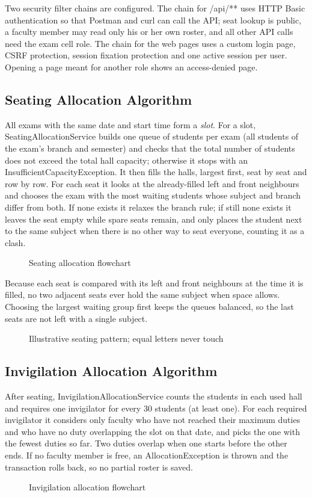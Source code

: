 \documentclass[12pt,letterpaper]{article}
\renewcommand{\texttt}[1]{#1}
\begin{document}
Two security filter chains are configured. The chain for \texttt{/api/**} uses HTTP Basic authentication so that Postman and curl can call the API; seat lookup is public, a faculty member may read only his or her own roster, and all other API calls need the exam cell role. The chain for the web pages uses a custom login page, CSRF protection, session fixation protection and one active session per user. Opening a page meant for another role shows an access-denied page.

\subsection{Seating Allocation Algorithm}
All exams with the same date and start time form a \emph{slot}. For a slot, \texttt{SeatingAllocationService} builds one queue of students per exam (all students of the exam's branch and semester) and checks that the total number of students does not exceed the total hall capacity; otherwise it stops with an \texttt{InsufficientCapacityException}. It then fills the halls, largest first, seat by seat and row by row. For each seat it looks at the already-filled left and front neighbours and chooses the exam with the most waiting students whose subject and branch differ from both. If none exists it relaxes the branch rule; if still none exists it leaves the seat empty while spare seats remain, and only places the student next to the same subject when there is no other way to seat everyone, counting it as a clash.
\begin{figure}[H]\centering
\resizebox{!}{0.55\textheight}{}
\caption{Seating allocation flowchart}
\end{figure}
Because each seat is compared with its left and front neighbours at the time it is filled, no two adjacent seats ever hold the same subject when space allows. Choosing the largest waiting group first keeps the queues balanced, so the last seats are not left with a single subject.
\begin{figure}[H]\centering

\caption{Illustrative seating pattern; equal letters never touch}
\end{figure}

\subsection{Invigilation Allocation Algorithm}
After seating, \texttt{InvigilationAllocationService} counts the students in each used hall and requires one invigilator for every 30 students (at least one). For each required invigilator it considers only faculty who have not reached their maximum duties and who have no duty overlapping the slot on that date, and picks the one with the fewest duties so far. Two duties overlap when one starts before the other ends. If no faculty member is free, an \texttt{AllocationException} is thrown and the transaction rolls back, so no partial roster is saved.
\begin{figure}[H]\centering
\resizebox{!}{0.5\textheight}{}
\caption{Invigilation allocation flowchart}
\end{figure}
\end{document}
